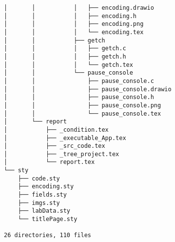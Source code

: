 \begin{verbatim}
│       │           │   ├── encoding.drawio
│       │           │   ├── encoding.h
│       │           │   ├── encoding.png
│       │           │   └── encoding.tex
│       │           ├── getch
│       │           │   ├── getch.c
│       │           │   ├── getch.h
│       │           │   └── getch.tex
│       │           └── pause_console
│       │               ├── pause_console.c
│       │               ├── pause_console.drawio
│       │               ├── pause_console.h
│       │               ├── pause_console.png
│       │               └── pause_console.tex
│       └── report
│           ├── _condition.tex
│           ├── _executable_App.tex
│           ├── _src_code.tex
│           ├── _tree_project.tex
│           └── report.tex
└── sty
    ├── code.sty
    ├── encoding.sty
    ├── fields.sty
    ├── imgs.sty
    ├── labData.sty
    └── titlePage.sty

26 directories, 110 files
\end{verbatim}